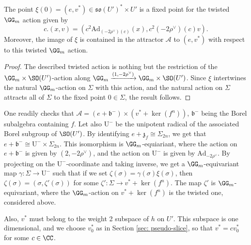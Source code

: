 \documentclass[11pt]{article}
\begin{document}
\begin{corollary}
    The point $\xi(0)=(e,v^*)\in \mathfrak{so}(U')^*\times U'$ is a fixed point for the twisted $\GG_m$ action given by $$c.(x,v)=(c^2\mathrm{Ad}_{(-2\rho^\vee)(c)}(x), c^2 (-2\rho^\vee)(c) v).$$
    Moreover, the image of $\xi$ is contained in the attractor $\mathcal{A}$ to $(e, v^*)$ with respect to this twisted $\GG_m$ action.
\end{corollary}
\begin{proof}
    The described twisted action is nothing but the restriction of the $\GG_m\times \SO(U')$-action along $\GG_m\xrightarrow{(1, -2\rho^\vee)}\GG_m\times \SO(U')$. Since $\xi$ intertwines the natural $\GG_m$-action on $\Sigma$ with this action, and the natural action on $\Sigma$ attracts all of $\Sigma$ to the fixed point $0\in\Sigma$, the result follows.
\end{proof}
One readily checks that $\mathcal{A} = (e + \mathfrak{b}^-)\times (v^* + \ker(f^n))$, $\mathfrak{b}^-$ being the Borel subalgebra containing $f$. Let also $\mathrm{U}^-$ be the unipotent radical of the associated Borel subgroup of $\SO(U')$. By identifying $e+\mathfrak{z}_f\cong \Sigma_{2n}$, we get that $e + \mathfrak{b}^-\cong \mathrm{U}^-\times \Sigma_{2n}$. This isomorphism is $\GG_m$-equiariant, where the action on $e+\mathfrak{b}^-$ is given by $(2, -2\rho^\vee)$, and the action on $\mathrm{U}^-$ is given by $\mathrm{Ad}_{-2\rho^\vee}$. By projecting on the $\mathrm{U}^-$-coordinate and taking inverse, we get a $\GG_m$-equivariant map $\gamma:\Sigma\to \mathrm{U}^-$ such that if we set $\zeta(\sigma) = \gamma(\sigma)\xi(\sigma)$, then $\zeta(\sigma) = (\sigma, \zeta'(\sigma))$ for some $\zeta':\Sigma\to v^* + \ker(f^n)$. The map $\zeta'$ is $\GG_m$-equivariant, where the $\GG_m$-action on $v^*+\ker(f^n)$ is the twisted one, considered above.

Also, $v^*$ must belong to the weight 2 subspace of $h$ on $U'$. This subspace is one dimensional, and we choose $v_0^*$ as in Section \ref{sec: pseudo-slice}, so that $v^* = cv_0^*$ for some $c\in \CC$.
\end{document}
